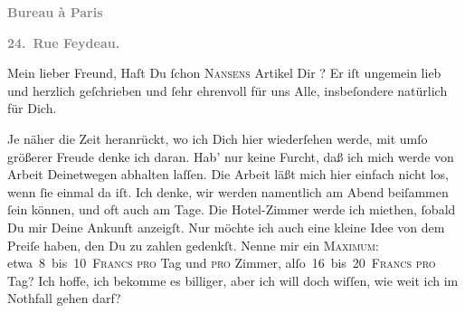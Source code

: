 \pstart
           \begin{otherlanguage}{french}\textcolor{gray}{\textbf{\textbf{Bureau à Paris}}}\end{otherlanguage}\pend
           
\pstart
           \begin{otherlanguage}{french}\textcolor{gray}{\textbf{\textbf{24. Rue Feydeau.}}}\end{otherlanguage}\pend
           
\pstart\center{}Mein lieber Freund,\pend\vspace{0.5em}
\pstart
           Haſt Du ſchon \textsc{Nansens}{ }Artikel Dir \label{K_L02806-1v}\label{K_L02806-1}? Er iſt ungemein lieb und herzlich geſchrieben und ſehr ehrenvoll für uns
               Alle, insbeſondere natürlich für Dich.\pend
           
\pstart
           Je näher die Zeit heranrückt, wo ich Dich hier wiederſehen werde, mit umſo größerer
               Freude denke ich daran. Hab’ nur keine Furcht, daß ich mich werde von Arbeit
               Deinetwegen abhalten laſſen. Die Arbeit läßt mich hier einfach nicht los, wenn ſie
               einmal da iſt. Ich denke, wir werden namentlich am Abend beiſammen ſein können, und oft auch am Tage. {\pb} Die Hotel-Zimmer werde ich miethen, ſobald Du mir
               Deine Ankunft anzeigſt. Nur möchte ich auch eine kleine Idee von dem Preiſe haben,
               den Du zu zahlen gedenkſt. \strikeout{\textcolor{gray}{Nenne}} Nenne mir ein \textsc{Maximum}: etwa 8 bis 10 \textsc{Francs}{ }\textsc{pro} Tag und \textsc{pro} Zimmer,
                  alſo 16 bis 20 \textsc{Francs}{ }\textsc{pro} Tag? Ich hoffe, ich bekomme es billiger, aber ich will
               doch wiſſen, wie weit ich im Nothfall gehen darf?\pend
           
